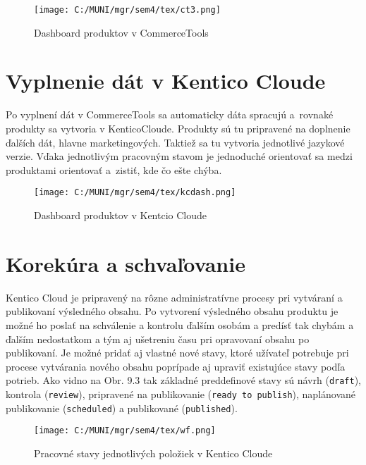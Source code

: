 \documentclass[
  printed, %
  table,   %
  lof,     %
  nolot,     %
  twoside,  
]{fithesis3}
\begin{document}
\begin{figure}[h]
  \begin{center}
        \texttt{[image: C:/MUNI/mgr/sem4/tex/ct3.png]}
  \end{center}
  \caption{Dashboard produktov v CommerceTools \cite{ecdash}}
  \label{fig:dashboard CT}
\end{figure}
\section{Vyplnenie dát v Kentico Cloude}
Po vyplnení dát v CommerceTools sa automaticky dáta spracujú a~rovnaké produkty sa vytvoria v KenticoCloude. Produkty sú tu pripravené na doplnenie ďalších dát, hlavne marketingových. Taktiež sa tu vytvoria jednotlivé jazykové verzie. Vďaka jednotlivým pracovným stavom je jednoduché orientovať sa medzi produktami orientovať a~zistiť, kde čo ešte chýba.
\begin{figure}[h]
  \begin{center}
        \texttt{[image: C:/MUNI/mgr/sem4/tex/kcdash.png]}
  \end{center}
  \caption{Dashboard produktov v Kentcio Cloude \cite{kcdash}}
  \label{fig:dashboard CT}
\end{figure}


\section{Korekúra a schvaľovanie}
Kentico Cloud je pripravený na rôzne administratívne procesy pri vytváraní a publikovaní výsledného obsahu. Po vytvorení výsledného obsahu produktu je možné ho poslať na schválenie a kontrolu ďalším osobám a predísť tak chybám a ďalším nedostatkom a tým aj ušetreniu času pri opravovaní obsahu po publikovaní. Je možné pridať aj vlastné nové stavy, ktoré užívateľ potrebuje pri procese vytvárania nového obsahu poprípade aj upraviť existujúce stavy podľa potrieb. Ako vidno na Obr. 9.3 tak základné preddefinové stavy sú návrh (\texttt{draft}), kontrola (\texttt{review}), pripravené na publikovanie (\texttt{ready to publish}), naplánované publikovanie (\texttt{scheduled}) a publikované (\texttt{published}).
\begin{figure}[h]
  \begin{center}
        \texttt{[image: C:/MUNI/mgr/sem4/tex/wf.png]}
  \end{center}
  \caption{Pracovné stavy jednotlivých položiek v Kentico Cloude \cite{kcdash}}
  \label{fig:produkt type}
\end{figure}
\end{document}
